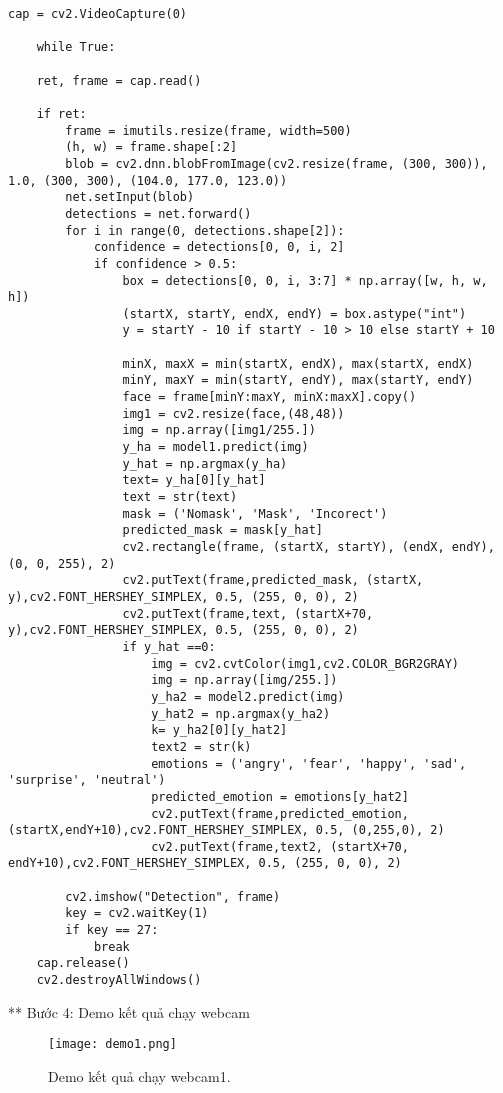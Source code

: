 \begin{lstlisting}[style=codePython]
	cap = cv2.VideoCapture(0)
	
	while True:
	
	ret, frame = cap.read()
	
	if ret:       
		frame = imutils.resize(frame, width=500)
		(h, w) = frame.shape[:2]
		blob = cv2.dnn.blobFromImage(cv2.resize(frame, (300, 300)), 1.0, (300, 300), (104.0, 177.0, 123.0))
		net.setInput(blob)
		detections = net.forward()
		for i in range(0, detections.shape[2]):
			confidence = detections[0, 0, i, 2]
			if confidence > 0.5:
				box = detections[0, 0, i, 3:7] * np.array([w, h, w, h])
				(startX, startY, endX, endY) = box.astype("int")
				y = startY - 10 if startY - 10 > 10 else startY + 10
	
				minX, maxX = min(startX, endX), max(startX, endX)
				minY, maxY = min(startY, endY), max(startY, endY)
				face = frame[minY:maxY, minX:maxX].copy()
				img1 = cv2.resize(face,(48,48))
				img = np.array([img1/255.])
				y_ha = model1.predict(img)
				y_hat = np.argmax(y_ha)
				text= y_ha[0][y_hat]
				text = str(text)
				mask = ('Nomask', 'Mask', 'Incorect')
				predicted_mask = mask[y_hat] 
				cv2.rectangle(frame, (startX, startY), (endX, endY), (0, 0, 255), 2)
				cv2.putText(frame,predicted_mask, (startX, y),cv2.FONT_HERSHEY_SIMPLEX, 0.5, (255, 0, 0), 2) 
				cv2.putText(frame,text, (startX+70, y),cv2.FONT_HERSHEY_SIMPLEX, 0.5, (255, 0, 0), 2) 
				if y_hat ==0:                  
					img = cv2.cvtColor(img1,cv2.COLOR_BGR2GRAY)
					img = np.array([img/255.])
					y_ha2 = model2.predict(img)
					y_hat2 = np.argmax(y_ha2)
					k= y_ha2[0][y_hat2]
					text2 = str(k)
					emotions = ('angry', 'fear', 'happy', 'sad', 'surprise', 'neutral')
					predicted_emotion = emotions[y_hat2]
					cv2.putText(frame,predicted_emotion, (startX,endY+10),cv2.FONT_HERSHEY_SIMPLEX, 0.5, (0,255,0), 2)
					cv2.putText(frame,text2, (startX+70, endY+10),cv2.FONT_HERSHEY_SIMPLEX, 0.5, (255, 0, 0), 2)
	
		cv2.imshow("Detection", frame)
		key = cv2.waitKey(1)
		if key == 27:
			break
	cap.release()
	cv2.destroyAllWindows()							
\end{lstlisting}

**  Bước 4: Demo kết quả chạy webcam

\begin{figure}[h!]
	\centering
	\texttt{[image: demo1.png]}
	\caption[Demo kết quả chạy webcam1.]{Demo kết quả chạy webcam1.}
	\label{fig:demo1} 
\end{figure}

